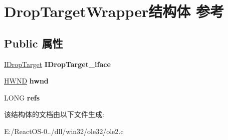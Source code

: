 \hypertarget{struct_drop_target_wrapper}{}\section{Drop\+Target\+Wrapper结构体 参考}
\label{struct_drop_target_wrapper}
\subsection*{Public 属性}
\begin{DoxyCompactItemize}
\item 
\mbox{\label{struct_drop_target_wrapper_aada4ae8b8cbd636346c3d2bd0b96608a}} 
\hyperlink{interface_i_drop_target}{I\+Drop\+Target} {\bfseries I\+Drop\+Target\+\_\+iface}
\item 
\mbox{\label{struct_drop_target_wrapper_ab8ace5c8d842dcabc868935c2cc375e0}} 
\hyperlink{interfacevoid}{H\+W\+ND} {\bfseries hwnd}
\item 
\mbox{\label{struct_drop_target_wrapper_ab3dc6f0a534f07fe9afbae46293c266b}} 
L\+O\+NG {\bfseries refs}
\end{DoxyCompactItemize}


该结构体的文档由以下文件生成\+:\begin{DoxyCompactItemize}
\item 
E\+:/\+React\+O\+S-\/0../dll/win32/ole32/ole2.\+c\end{DoxyCompactItemize}
